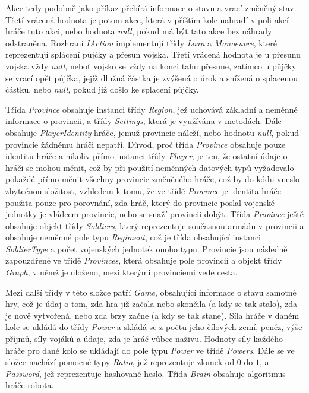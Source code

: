 \documentclass[a4paper,12pt]{article}
\begin{document}
Akce tedy podobně jako příkaz přebírá informace o stavu a vrací změněný stav. Třetí vrácená hodnota je potom akce, která v příštím kole nahradí v poli akcí hráče tuto akci, nebo hodnota \textit{null}, pokud má být tato akce bez náhrady odstraněna. Rozhraní \textit{IAction} implementují třídy \textit{Loan} a \textit{Manoeuvre}, které reprezentují splácení půjčky a přesun vojska. Třetí vrácená hodnota je u přesunu vojska vždy \textit{null}, neboť vojsko se vždy na konci tahu přesune, zatímco u půjčky se vrací opět půjčka, jejíž dlužná částka je zvýšená o úrok a snížená o splacenou částku, nebo \textit{null}, pokud již došlo ke splacení půjčky.

Třída \textit{Province} obsahuje instanci třídy \textit{Region}, jež uchovává základní a neměnné informace o provincii, a třídy \textit{Settings}, která je využívána v metodách. Dále obsahuje \textit{PlayerIdentity} hráče, jemuž provincie náleží, nebo hodnotu \textit{null}, pokud provincie žádnému hráči nepatří. Důvod, proč třída \textit{Province} obsahuje pouze identitu hráče a nikoliv přímo instanci třídy \textit{Player}, je ten, že ostatní údaje o hráči se mohou měnit, což by při použití neměnných datových typů vyžadovalo pokaždé přímo měnit všechny provincie změněného hráče, což by do kódu vneslo zbytečnou složitost, vzhledem k tomu, že ve třídě \textit{Province} je identita hráče použita pouze pro porovnání, zda hráč, který do provincie poslal vojenské jednotky je vládcem provincie, nebo se snaží provincii dobýt. Třída \textit{Province} ještě obsahuje objekt třídy \textit{Soldiers}, který reprezentuje současnou armádu v provincii a obsahuje neměnné pole typu \textit{Regiment}, což je třída obsahující instanci \textit{SoldierType} a počet vojenských jednotek onoho typu. Provincie jsou následně zapouzdřené ve třídě \textit{Provinces}, která obsahuje pole provincií a objekt třídy \textit{Graph}, v němž je uloženo, mezi kterými provinciemi vede cesta.

Mezi další třídy v této složce patří \textit{Game}, obsahující informace o stavu samotné hry, což je údaj o tom, zda hra již začala nebo skončila (a kdy se tak stalo), zda je nově vytvořená, nebo zda brzy začne (a kdy se tak stane). Síla hráče v daném kole se ukládá do třídy \textit{Power} a skládá se z počtu jeho čílových zemí, peněz, výše příjmů, síly vojáků a údaje, zda je hráč vůbec naživu. Hodnoty síly každého hráče pro dané kolo se ukládají do pole typu \textit{Power} ve třídě \textit{Powers}. Dále se ve složce nachází pomocné typy \textit{Ratio}, jež reprezentuje zlomek od $0$ do $1$, a \textit{Password}, jež reprezentuje hashované heslo. Třída \textit{Brain} obsahuje algoritmus hráče robota.
\end{document}
